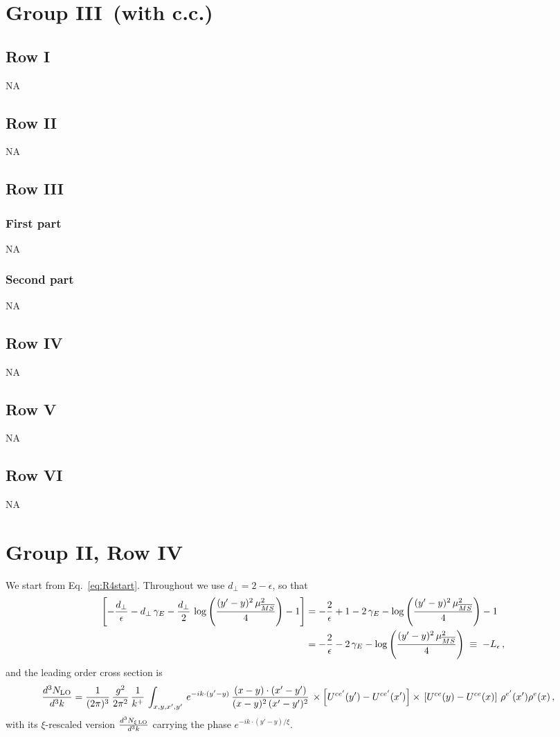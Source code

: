 \documentclass[9pt]{article}
\numberwithin{equation}{section}
\begin{document}
\section{Group III\, (with c.c.)}
\subsection{Row I}
\textsc{NA}
\subsection{Row II}
\textsc{NA}
 \subsection{Row III}
\subsubsection{First part}
\textsc{NA}
\subsubsection{Second part}
\textsc{NA}
\subsection{Row IV}
\textsc{NA}
\subsection{Row V}
\textsc{NA}
\subsection{Row VI}
\textsc{NA}
\section{Group II, Row IV}\label{sec:R4}
We start from Eq.~\eqref{eq:R4start}. Throughout we use $d_{\perp}=2-\epsilon$, so that
\begin{align}
    \left[-\frac{d_{\perp}}{\epsilon}-d_{\perp}\,\gamma_{E}-\frac{d_{\perp}}{2}\,\log{\left(\frac{(y'-y)^{2}\,\mu^{2}_{\overline{MS}}}{4}\right)}-1\right] & = -\frac{2}{\epsilon}+1-2\,\gamma_{E}-\log{\left(\frac{(y'-y)^{2}\,\mu^{2}_{\overline{MS}}}{4}\right)} -1 \notag \\ & =  -\frac{2}{\epsilon}-2\,\gamma_{E}-\log{\left(\frac{(y'-y)^{2}\,\mu^{2}_{\overline{MS}}}{4}\right)}\;\equiv\;-L_{\epsilon}\,,
\end{align}
and the leading order cross section is
\begin{align}
    \frac{d^{3}N_{\rm LO}}{d^{3}k} & = \frac{1}{(2\pi)^{3}}\, \frac{g^{2}}{2\pi^{2}}\, \frac{1}{k^{+}}\,\int_{x,y,x',y'}\, e^{-ik\cdot (y'-y)}\, \frac{(x-y)\cdot (x'-y')}{(x-y)^{2}\,(x'-y')^{2}}\,\times \left[U^{ce'}(y') - U^{ce'}(x')\right] \times\, \left[U^{ce}(y) - U^{ce}(x)\right]\, \rho^{e'}(x') \rho^{e}(x)\,,
\end{align}
with its $\xi$-rescaled version $\frac{d^{3}N_{\xi\,\rm LO}}{d^{3}k}$ carrying the phase $e^{-ik\cdot(y'-y)/\xi}$.
\end{document}
